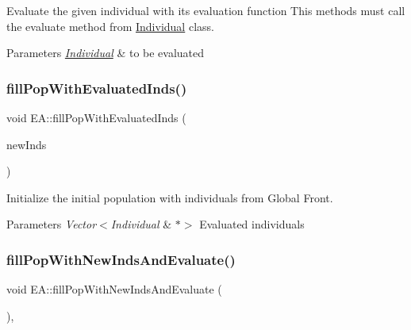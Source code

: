 Evaluate the given individual with its evaluation function This methods must call the evaluate method from \mbox{\hyperlink{classIndividual}{Individual}} class. 


\begin{DoxyParams}{Parameters}
{\em \mbox{\hyperlink{classIndividual}{Individual}}} & to be evaluated \\
\hline
\end{DoxyParams}
\mbox{\label{classEA_a6ab8cb75b4a102d91579a58ecb815f6c}} 
\subsubsection{\texorpdfstring{fill\+Pop\+With\+Evaluated\+Inds()}{fillPopWithEvaluatedInds()}}
{\footnotesize\ttfamily void E\+A\+::fill\+Pop\+With\+Evaluated\+Inds (\begin{DoxyParamCaption}\item[{const vector$<$ \mbox{\hyperlink{classIndividual}{Individual}} $\ast$$>$ \&}]{new\+Inds }\end{DoxyParamCaption})}



Initialize the initial population with individuals from Global Front. 


\begin{DoxyParams}{Parameters}
{\em Vector$<$\+Individual} & $\ast$$>$ Evaluated individuals \\
\hline
\end{DoxyParams}
\mbox{\label{classEA_ae99a3c887d3014a59bce9501add80308}} 
\subsubsection{\texorpdfstring{fill\+Pop\+With\+New\+Inds\+And\+Evaluate()}{fillPopWithNewIndsAndEvaluate()}}
{\footnotesize\ttfamily void E\+A\+::fill\+Pop\+With\+New\+Inds\+And\+Evaluate (\begin{DoxyParamCaption}{ }\end{DoxyParamCaption})\hspace{0.3cm}{\ttfamily [private]}, {\ttfamily [virtual]}}



